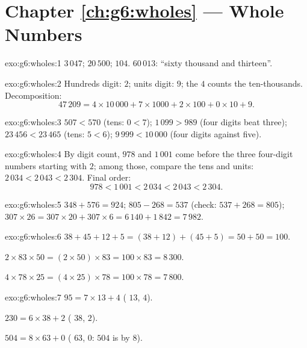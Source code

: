 \section*{Chapter \ref{ch:g6:wholes} --- Whole Numbers}

\begin{solution}{exo:g6:wholes:1}
$3\,047$; \quad $20\,500$; \quad $104$. \quad
$60\,013$: ``sixty thousand and thirteen''.
\end{solution}

\begin{solution}{exo:g6:wholes:2}
Hundreds digit: $2$; units digit: $9$; the $4$ counts the
ten-thousands. Decomposition:
\[
47\,209 = 4 \times 10\,000 + 7 \times 1000 + 2 \times 100 + 0 \times 10
+ 9 .
\]
\end{solution}

\begin{solution}{exo:g6:wholes:3}
$507 < 570$ (tens: $0 < 7$); \quad
$1\,099 > 989$ (four digits beat three); \quad
$23\,456 < 23\,465$ (tens: $5 < 6$); \quad
$9\,999 < 10\,000$ (four digits against five).
\end{solution}

\begin{solution}{exo:g6:wholes:4}
By digit count, $978$ and $1\,001$ come before the three
four-digit numbers starting with $2$; among those, compare the tens and
units: $2\,034 < 2\,043 < 2\,304$. Final order:
\[
978 < 1\,001 < 2\,034 < 2\,043 < 2\,304 .
\]
\end{solution}

\begin{solution}{exo:g6:wholes:5}
$348 + 576 = 924$; \quad $805 - 268 = 537$ (check:
$537 + 268 = 805$); \quad $307 \times 26 = 307 \times 20 + 307 \times 6
= 6\,140 + 1\,842 = 7\,982$.
\end{solution}

\begin{solution}{exo:g6:wholes:6}
$38 + 45 + 12 + 5 = (38 + 12) + (45 + 5) = 50 + 50 = 100$.

$2 \times 83 \times 50 = (2 \times 50) \times 83 = 100 \times 83 =
8\,300$.

$4 \times 78 \times 25 = (4 \times 25) \times 78 = 100 \times 78 =
7\,800$.
\end{solution}

\begin{solution}{exo:g6:wholes:7}
$95 = 7 \times 13 + 4$ ( $13$,  $4$).

$230 = 6 \times 38 + 2$ ( $38$,  $2$).

$504 = 8 \times 63 + 0$ ( $63$,  $0$: $504$ is
 by $8$).
\end{solution}

